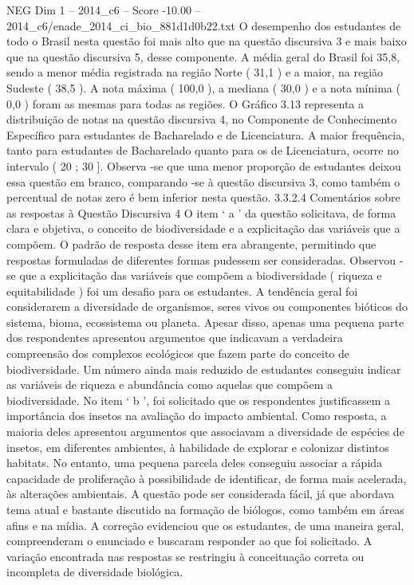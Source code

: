 \begin{textsample}{NEG Dim 1 – 2014\_c6 – Score -10.00 – 2014\_c6/enade\_2014\_ci\_bio\_881d1d0b22.txt}
O desempenho dos estudantes de todo o Brasil nesta questão foi mais alto que na questão discursiva 3 e mais baixo que na questão discursiva 5, desse componente.
A média geral do Brasil foi 35,8, sendo a menor média registrada na região Norte ( 31,1 ) e a maior, na região Sudeste ( 38,5 ).
A nota máxima ( 100,0 ), a mediana ( 30,0 ) e a nota mínima ( 0,0 ) foram as mesmas para todas as regiões.
O Gráfico 3.13 representa a distribuição de notas na questão discursiva 4, no Componente de Conhecimento Específico para estudantes de Bacharelado e de Licenciatura.
A maior frequência, tanto para estudantes de Bacharelado quanto para os de Licenciatura, ocorre no intervalo ( 20 ; 30 ].
Observa -se que uma menor proporção de estudantes deixou essa questão em branco, comparando -se à questão discursiva 3, como também o percentual de notas zero é bem inferior nesta questão. 3.3.2.4 Comentários sobre as respostas à Questão Discursiva 4 O item ‘ a ’ da questão solicitava, de forma clara e objetiva, o conceito de biodiversidade e a explicitação das variáveis que a compõem.
O padrão de resposta desse item era abrangente, permitindo que respostas formuladas de diferentes formas pudessem ser consideradas.
Observou -se que a explicitação das variáveis que compõem a biodiversidade ( riqueza e equitabilidade ) foi um desafio para os estudantes.
A tendência geral foi considerarem a diversidade de organismos, seres vivos ou componentes bióticos do sistema, bioma, ecossistema ou planeta.
Apesar disso, apenas uma pequena parte dos respondentes apresentou argumentos que indicavam a verdadeira compreensão dos complexos ecológicos que fazem parte do conceito de biodiversidade.
Um número ainda mais reduzido de estudantes conseguiu indicar as variáveis de riqueza e abundância como aquelas que compõem a biodiversidade.
No item ‘ b ’, foi solicitado que os respondentes justificassem a importância dos insetos na avaliação do impacto ambiental.
Como resposta, a maioria deles apresentou argumentos que associavam a diversidade de espécies de insetos, em diferentes ambientes, à habilidade de explorar e colonizar distintos habitats.
No entanto, uma pequena parcela deles conseguiu associar a rápida capacidade de proliferação à possibilidade de identificar, de forma mais acelerada, às alterações ambientais.
A questão pode ser considerada fácil, já que abordava tema atual e bastante discutido na formação de biólogos, como também em áreas afins e na mídia.
A correção evidenciou que os estudantes, de uma maneira geral, compreenderam o enunciado e buscaram responder ao que foi solicitado.
A variação encontrada nas respostas se restringiu à conceituação correta ou incompleta de diversidade biológica.

\end{textsample}
